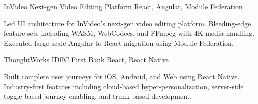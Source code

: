 \begin{cventries}
	\cventry
	{InVideo} %
	{Next-gen Video Editing Platform} %
	{} %
	{React, Angular, Module Federation} %
	{
		\begin{cvitems}
			\item[] Led UI architecture for InVideo's next-gen video editing platform. Bleeding-edge feature sets including WASM, WebCodecs, and FFmpeg with 4K media handling. Executed large-scale Angular to React migration using Module Federation.
		\end{cvitems}
	}

	\cventry
	{ThoughtWorks} %
	{IDFC First Bank} %
	{} %
	{React, React Native} %
	{
		\begin{cvitems}
			\item[] Built complete user journeys for iOS, Android, and Web using React Native. Industry-first features including cloud-based hyper-personalization, server-side toggle-based journey enabling, and trunk-based development.
		\end{cvitems}
	}





\end{cventries}
